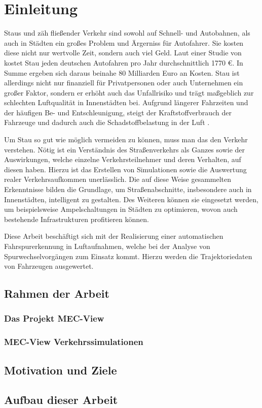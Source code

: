 
\chapter{Einleitung}
\label{cha:introduction}

Staus und zäh fließender Verkehr sind sowohl auf Schnell- und Autobahnen, als auch in Städten ein großes
Problem und Ärgerniss für Autofahrer. Sie kosten diese nicht nur wertvolle Zeit, sondern auch viel Geld.
Laut einer Studie von \cite{Cookson} kostet Stau jeden deutschen Autofahren pro Jahr durchschnittlich 1770 €.
In Summe ergeben sich daraus beinahe 80 Milliarden Euro an Kosten.
Stau ist allerdings nicht nur finanziell für Privatpersonen oder auch Unternehmen ein großer Faktor,
sondern er erhöht auch das Unfallrisiko und trägt maßgeblich zur schlechten Luftqualität in Innenstädten bei.
Aufgrund längerer Fahrzeiten und der häufigen Be- und Entschleunigung, steigt der Kraftstoffverbrauch der
Fahrzeuge und dadurch auch die Schadstoffbelastung in der Luft \cite{Hemmerle2016}.

Um Stau so gut wie möglich vermeiden zu können, muss man das den Verkehr verstehen. Nötig
ist ein Verständnis des Straßenverkehrs als Ganzes sowie der Auswirkungen, welche einzelne Verkehrsteilnehmer
und deren Verhalten, auf diesen haben. Hierzu ist das Erstellen von Simulationen sowie die Auswertung
realer Verkehrsaufkommen unerlässlich.
Die auf diese Weise gesammelten Erkenntnisse bilden die Grundlage, um Straßenabschnitte, insbesondere
auch in Innenstädten, intelligent zu gestalten.
Des Weiteren können sie eingesetzt werden, um beispielsweise Ampelschaltungen in Städten zu optimieren,
wovon auch bestehende Infrastrukturen profitieren können.

Diese Arbeit beschäftigt sich mit der Realisierung einer automatischen Fahrspurerkennung in Luftaufnahmen,
welche bei der Analyse von Spurwechselvorgängen zum Einsatz kommt. Hierzu werden die Trajektoriedaten von Fahrzeugen
ausgewertet.


\section{Rahmen der Arbeit}
\label{sec:rahmen_arbeit}

\subsection{Das Projekt MEC-View}
\label{sec:mec_view}

\subsection{MEC-View Verkehrssimulationen}
\label{sec:mecview_sim}

\section{Motivation und Ziele}
\label{sec:motivation_goals}





\section{Aufbau dieser Arbeit}
\label{sec:aufbau}
